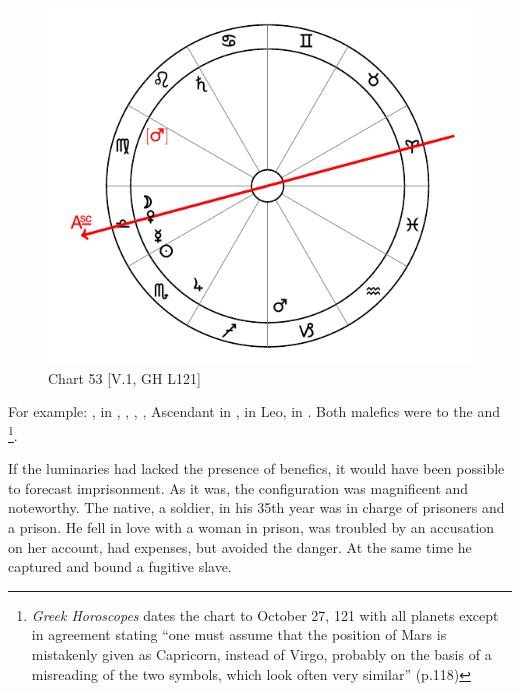 \enlargethispage{3\baselineskip}
\begin{figure}
\centering
\vspace{-25pt}
\includegraphics[width=.68\textwidth]{charts/5_01_1}
\caption{Chart 53 [V.1, GH L121]}
\label{fig:chart53}
\end{figure}

For example: \Sun, \Jupiter\xspace in \Scorpio, \Moon, \Mercury, \Venus, Ascendant in \Libra, \Saturn\xspace in Leo,
\Mars\xspace in \Capricorn. Both malefics were \Sextile\xspace to the \Sun\xspace and \Moon\footnote{\textit{Greek Horoscopes} dates the chart to October 27, 121 with all planets except \Mars\xspace in agreement stating ``one must assume that the position of Mars is mistakenly given as Capricorn, instead of Virgo, probably on the basis of a misreading of the two symbols, which look often very similar'' (p.118)}. 

If the luminaries had lacked the presence of benefics, it would have been possible to forecast imprisonment. As it was, the configuration was magnificent and noteworthy. The native, a soldier, in his 35th year was in charge of prisoners and a prison. He fell in love with a woman in prison, was troubled by an accusation on her account, had expenses, but avoided the danger. At the same time he captured and bound a fugitive slave.

\newpage

